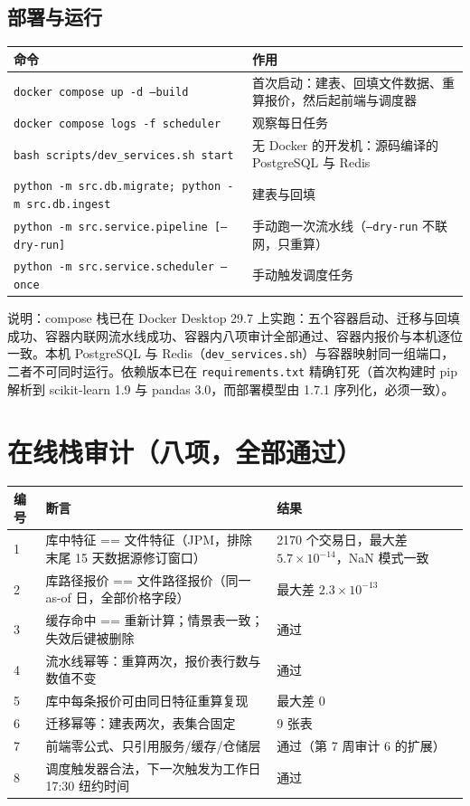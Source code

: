\documentclass[11pt]{ctexart}
\begin{document}
\subsection{部署与运行}

\begin{center}\small
\begin{tabular}{p{6.6cm}p{8.2cm}}
\toprule
命令 & 作用 \\
\midrule
\texttt{docker compose up -d --build} & 首次启动：建表、回填文件数据、重算报价，然后起前端与调度器 \\
\texttt{docker compose logs -f scheduler} & 观察每日任务 \\
\texttt{bash scripts/dev\_services.sh start} & 无 Docker 的开发机：源码编译的 PostgreSQL 与 Redis \\
\texttt{python -m src.db.migrate; python -m src.db.ingest} & 建表与回填 \\
\texttt{python -m src.service.pipeline [--dry-run]} & 手动跑一次流水线（\texttt{--dry-run} 不联网，只重算） \\
\texttt{python -m src.service.scheduler --once} & 手动触发调度任务 \\
\bottomrule
\end{tabular}
\end{center}

说明：compose 栈已在 Docker Desktop 29.7 上实跑：五个容器启动、迁移与回填成功、容器内联网流水线成功、容器内八项审计全部通过、容器内报价与本机逐位一致。本机 PostgreSQL 与 Redis（\texttt{dev\_services.sh}）与容器映射同一组端口，二者不可同时运行。依赖版本已在 \texttt{requirements.txt} 精确钉死（首次构建时 pip 解析到 scikit-learn 1.9 与 pandas 3.0，而部署模型由 1.7.1 序列化，必须一致）。

\section{在线栈审计（八项，全部通过）}

\begin{center}\small
\begin{tabular}{p{0.8cm}p{7.4cm}p{6.6cm}}
\toprule
编号 & 断言 & 结果 \\
\midrule
1 & 库中特征 == 文件特征（JPM，排除末尾 15 天数据源修订窗口） & 2170 个交易日，最大差 $5.7\times10^{-14}$，NaN 模式一致 \\
2 & 库路径报价 == 文件路径报价（同一 as-of 日，全部价格字段） & 最大差 $2.3\times10^{-13}$ \\
3 & 缓存命中 == 重新计算；情景表一致；失效后键被删除 & 通过 \\
4 & 流水线幂等：重算两次，报价表行数与数值不变 & 通过 \\
5 & 库中每条报价可由同日特征重算复现 & 最大差 0 \\
6 & 迁移幂等：建表两次，表集合固定 & 9 张表 \\
7 & 前端零公式、只引用服务/缓存/仓储层 & 通过（第 7 周审计 6 的扩展） \\
8 & 调度触发器合法，下一次触发为工作日 17:30 纽约时间 & 通过 \\
\bottomrule
\end{tabular}
\end{center}
\end{document}
